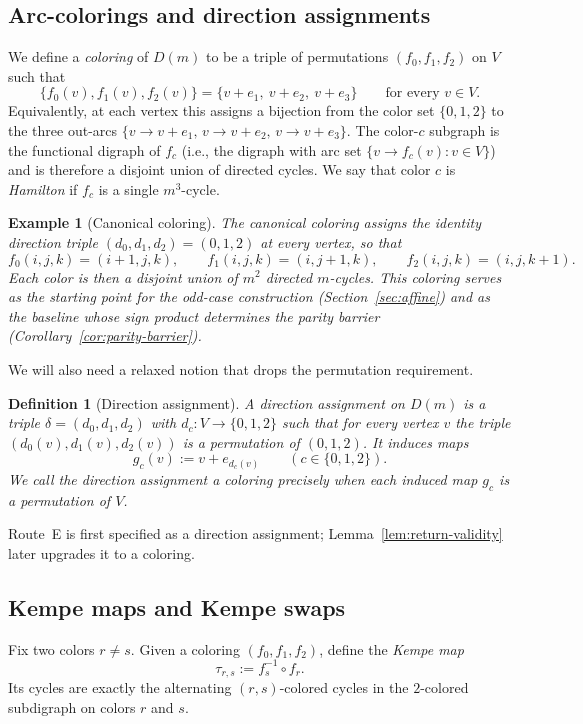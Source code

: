 \documentclass[11pt]{article}
\newtheorem{definition}{Definition}
\newtheorem{example}{Example}
\begin{document}
\subsection{Arc-colorings and direction assignments}
We define a \emph{coloring} of $D(m)$ to be a triple of permutations $(f_0,f_1,f_2)$ on $V$ such that
\[
\{f_0(v),f_1(v),f_2(v)\}=\{v+e_1,\ v+e_2,\ v+e_3\}
\qquad\text{for every }v\in V.
\]
Equivalently, at each vertex this assigns a bijection from the color set $\{0,1,2\}$ to the three out-arcs $\{v\to v+e_1,\, v\to v+e_2,\, v\to v+e_3\}$.
The color-$c$ subgraph is the functional digraph of $f_c$ (i.e., the digraph with arc set $\{v\to f_c(v):v\in V\}$) and is therefore a disjoint union of directed cycles.
We say that color $c$ is \emph{Hamilton} if $f_c$ is a single $m^3$-cycle.

\begin{example}[Canonical coloring]\label{ex:canonical}
The \emph{canonical coloring} assigns the identity direction triple
$(d_0,d_1,d_2)=(0,1,2)$ at every vertex, so that
\[
f_0(i,j,k)=(i+1,j,k),\qquad f_1(i,j,k)=(i,j+1,k),\qquad f_2(i,j,k)=(i,j,k+1).
\]
Each color is then a disjoint union of $m^2$ directed $m$-cycles.
This coloring serves as the starting point for the odd-case construction (Section~\ref{sec:affine})
and as the baseline whose sign product determines the parity barrier (Corollary~\ref{cor:parity-barrier}).
\end{example}

We will also need a relaxed notion that drops the permutation requirement.

\begin{definition}[Direction assignment]\label{def:direction-assignment}
A \emph{direction assignment} on $D(m)$ is a triple $\delta=(d_0,d_1,d_2)$ with $d_c:V\to\{0,1,2\}$ such that for every vertex $v$ the triple $(d_0(v),d_1(v),d_2(v))$ is a permutation of $(0,1,2)$.
It induces maps
\[
g_c(v):=v+e_{d_c(v)}\qquad (c\in\{0,1,2\}).
\]
We call the direction assignment a \emph{coloring} precisely when each induced map $g_c$ is a permutation of $V$.
\end{definition}

Route~E is first specified as a direction assignment; Lemma~\ref{lem:return-validity} later upgrades it to a coloring.

\subsection{Kempe maps and Kempe swaps}
Fix two colors $r\ne s$.
Given a coloring $(f_0,f_1,f_2)$, define the \emph{Kempe map}
\[
\tau_{r,s}:=f_s^{-1}\circ f_r.
\]
Its cycles are exactly the alternating $(r,s)$-colored cycles in the $2$-colored subdigraph on colors $r$ and $s$.
\end{document}
